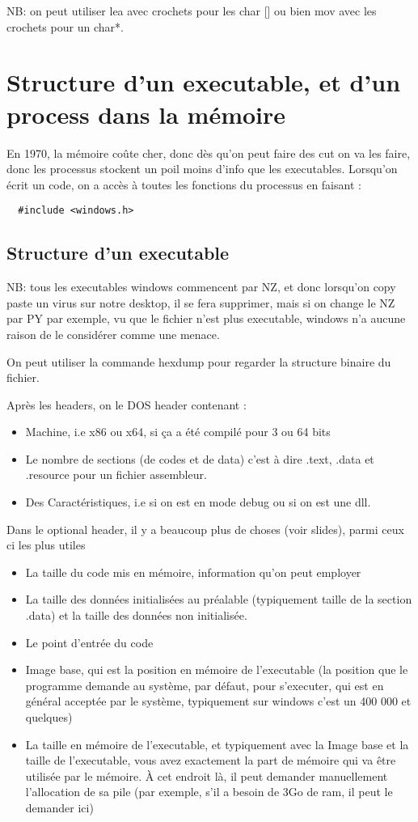 \documentclass[a4paper,10pt]{article}
\begin{document}
NB: on peut utiliser lea avec crochets pour les char [] ou bien mov avec les crochets pour un char*.

\section{Structure d'un executable, et d'un process dans la mémoire}

En 1970, la mémoire coûte cher, donc dès qu'on peut faire des cut on va les faire, donc les processus stockent un poil moins d'info que les executables. Lorsqu'on écrit un code, on a accès à toutes les fonctions du processus en faisant : 
\begin{lstlisting}
  #include <windows.h>
\end{lstlisting}

\subsection{Structure d'un executable}

NB: tous les executables windows commencent par NZ, et donc lorsqu'on copy paste un virus sur notre desktop, il se fera supprimer, mais si on change le NZ par PY par exemple, vu que le fichier n'est plus executable, windows n'a aucune raison de le considérer comme une menace.

On peut utiliser la commande hexdump pour regarder la structure binaire du fichier.

Après les headers, on le DOS header contenant : 
\begin{itemize}
 \item Machine, i.e x86 ou x64, si ça a été compilé pour 3 ou 64 bits
 \item Le nombre de sections (de codes et de data) c'est à dire .text, .data et .resource pour un fichier assembleur.
 \item Des Caractéristiques, i.e si on est en mode debug ou si on est une dll.
\end{itemize}

Dans le optional header, il y a beaucoup plus de choses (voir slides), parmi ceux ci les plus utiles
\begin{itemize}
 \item La taille du code mis en mémoire, information qu'on peut employer
 \item La taille des données initialisées au préalable (typiquement taille de la section .data) et la taille des données non initialisée.
 \item Le point d'entrée du code
 \item Image base, qui est la position en mémoire de l'executable (la position que le programme demande au système, par défaut, pour s'executer, qui est en général acceptée par le système, typiquement sur windows c'est un 400 000 et quelques)
 \item La taille en mémoire de l'executable, et typiquement avec la Image base et la taille de l'executable, vous avez exactement la part de mémoire qui va être utilisée par le mémoire. À cet endroit là, il peut demander manuellement l'allocation de sa pile (par exemple, s'il a besoin de 3Go de ram, il peut le demander ici)
\end{itemize}
\end{document}
